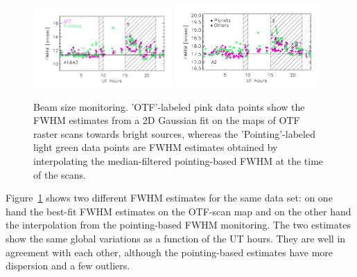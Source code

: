 \begin{figure}[ht!]
  \begin{center}
    \includegraphics[clip=true, trim={0.9cm, 0.5cm, 0.5cm, 0.5cm}, width=0.4725\textwidth]{Figures/Beam_monitoring_with_otfs_vs_ut_compare_pointings_1mm.pdf}
    \includegraphics[clip=true, trim={0.5cm, 0.5cm, 0.5cm, 0.5cm}, width=0.4875\textwidth]{Figures/Beam_monitoring_with_otfs_vs_ut_compare_pointings_a2.pdf}
    \caption[Beam size monitoring comparison]{Beam size monitoring.
     'OTF'-labeled pink data points show the FWHM estimates from a 2D
    Gaussian fit on the maps of OTF raster scans towards bright
    sources, whereas the 'Pointing'-labeled light green data points
    are FWHM estimates obtained by interpolating the {\lp
    median-filtered} pointing-based FWHM at the time of the scans.}
\label{fig:beam_monitoring_compare}
\end{center}
\end{figure}
%
Figure~\ref{fig:beam_monitoring_compare} shows two different FWHM %
estimates for the same data set: on one hand the best-fit FWHM %
estimates on the OTF-scan map and on the other hand the interpolation from
the pointing-based FWHM %
monitoring. The two estimates show the same global variations as a
function of the UT hours. They are well in agreement with each
other, although the pointing-based estimates have more dispersion and
a few outliers.



